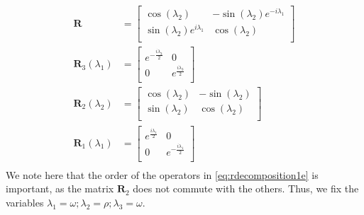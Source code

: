 \documentclass{aux/ttuthes2007}
\newcommand{\s}[1]{\sin\left( #1 \right)}
\newcommand{\co}[1]{\cos\left( #1 \right)}
\begin{document}
\begin{equation}
	\begin{split}
	\label{eq:rdecomposition1e}
	\bm R &= \begin{bmatrix}
		\co {\lambda_2} & - \s {\lambda_2} e^{-i{\lambda_1}} \\
		\s {\lambda_2} e^{i{\lambda_1}} & \co {\lambda_2}\\
	\end{bmatrix} \\
	\bm R_3({\lambda_1})  &=
	\begin{bmatrix}
		e^{-\frac{i{\lambda_3}} 2} & 0 \\
		0 & e^{\frac{i{\lambda_3}} 2}\\
	\end{bmatrix} \\
	\bm R_2({\lambda_2}) &= 
	\begin{bmatrix}
		\co {\lambda_2} & - \s {\lambda_2} \\
		\s {\lambda_2}  & \co {\lambda_2}\\
	\end{bmatrix} \\
	\bm R_1({\lambda_1}) &=
	\begin{bmatrix}
		e^{\frac{i{\lambda_1}} 2} & 0 \\
		0 & e^{-\frac{i{\lambda_1}} 2}\\
	\end{bmatrix} \\
	\end{split}
\end{equation}
%
We note here that the order of the operators in \ref{eq:rdecomposition1e} is important, as the matrix $\bm R_2$ does not commute with the others. Thus, we fix the variables 
$\lambda_1 = \omega;  \lambda_2 = \rho; \lambda_3 = \omega$.
%
%
\end{document}
